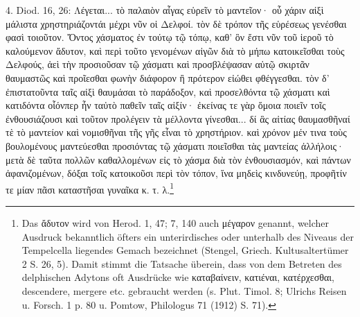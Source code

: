 \documentclass[a4paper, 11pt, oneside]{article}
\begin{document}
4. Diod. 16, 26: Λέγεται... τὸ παλαιὸν αἶγας εὑρεῖν τὸ μαντεῖον· οὗ χάριν αἰξὶ μάλιστα χρηστηριάζοντάι μέχρι νῦν οἱ Δελφοί. τὸν δὲ τρόπον τῆς εὑρέσεως γενέσθαι φασὶ τοιοῦτον. Ὄντος χάσματος ἐν τούτῳ τῷ τόπῳ, καθ' ὃν ἔστι νῦν τοῦ ἱεροῦ τὸ καλούμενον ἄδυτον, καὶ περὶ τοῦτο γενομένων αἰγῶν διὰ τὸ μήπω κατοικεῖσθαι τοὺς Δελφούς, ἀεὶ τὴν προσιοῦσαν τῷ χάσματι καὶ προσβλέψασαν αὐτῷ σκιρτᾶν θαυμαστῶς καὶ προῖεσθαι φωνὴν διάφορον ἢ πρότερον εἰώθει φθέγγεσθαι. τὸν δ' ἐπιστατοῦντα ταῖς αἰξὶ θαυμάσαι τὸ παράδοξον, καὶ προσελθόντα τῷ χάσματι καὶ κατιδόντα οἷόνπερ ἦν ταὐτὸ παθεῖν ταῖς αἰξίν· ἐκείνας τε γὰρ ὅμοια ποιεῖν τοῖς ἐνθουσιάζουσι καὶ τοῦτον προλέγειν τὰ μέλλοντα γίνεσθαι... δί ἃς αἰτίας θαυμασθῆναί τὲ τὸ μαντείον καὶ νομισθῆναι τῆς γῆς εἶναι τὸ χρηστήριον. καὶ χρόνον μέν τινα τοὺς βουλομένους μαντεύεσθαι προσιόντας τῷ χάσματι ποιεῖσθαι τὰς μαντείας ἀλλήλοις· μετὰ δὲ ταῦτα πολλῶν καθαλλομένων εἰς τὸ χάσμα διὰ τὸν ἐνθουσιασμόν, καὶ πάντων ἀφανιζομένων, δόξαι τοῖς κατοικοῦσι περὶ τὸν τόπον, ἵνα μηδεὶς κινδυνεύῃ, προφῆτίν τε μίαν πᾶσι καταστῆσαι γυναῖκα κ. τ. λ.\footnote{Das ἄδυτον wird von Herod. 1, 47; 7, 140 auch μέγαρον genannt, welcher Ausdruck bekanntlich öfters ein unterirdisches oder unterhalb des Niveaus der Tempelcella liegendes Gemach bezeichnet (Stengel, Griech. Kultusaltertümer 2 S. 26, 5). Damit stimmt die Tatsache überein, dass von dem Betreten des delphischen Adytons oft Ausdrücke wie καταβαίνειν, κατιέναι, κατέρχεσθαι, descendere, mergere etc. gebraucht werden (s. Plut. Timol. 8; Ulrichs Reisen u. Forsch. 1 p. 80 u. Pomtow, Philologus 71 (1912) S. 71).}
\end{document}
